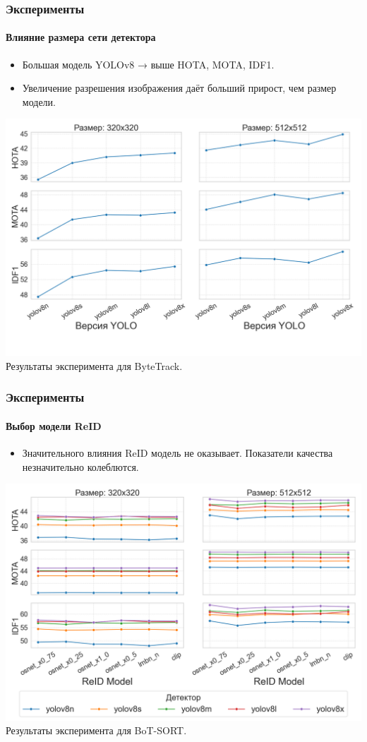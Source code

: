 \documentclass{beamer} %
\begin{document}
\begin{frame}
    \frametitle{Эксперименты}
    \framesubtitle{Влияние размера сети детектора}
    \begin{itemize}
      \item Большая модель YOLOv8 → выше HOTA, MOTA, IDF1.
      \item Увеличение разрешения изображения даёт больший прирост, чем размер модели.
    \end{itemize}
    \centering
    \includegraphics[width=0.7\linewidth]{images/plots/yolo_size_vs_metric/ByteTrack.png}\\
    \small Результаты эксперимента для ByteTrack.
\end{frame}

\begin{frame}
  \frametitle{Эксперименты}
  \framesubtitle{Выбор модели ReID}
  \begin{itemize}
    \item Значительного влияния ReID модель не оказывает. Показатели качества незначительно колеблются.
  \end{itemize}
  \centering
  \includegraphics[width=0.7\linewidth]{images/plots/yolo_size_and_reid_vs_metric/BoT-SORT.png}\\
  \small Результаты эксперимента для BoT-SORT.
\end{frame}
\end{document}
